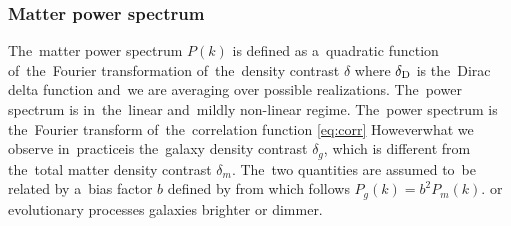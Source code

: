 \subsubsection{Matter power spectrum}
The~matter power spectrum $P(k)$ is defined as a~quadratic function of~the~Fourier transformation of~the~density contrast $\delta$ \DIFaddbegin \parencite{2010deto.book.....A}
\DIFaddend {}
where $\delta_{\rm D}$ is the~Dirac delta function and~we are averaging over possible realizations. The~power spectrum is \DIFdelbegin {}\DIFdelend \DIFaddbegin {}\DIFaddend in~the~linear and~mildly non-linear regime\DIFdelbegin {}\DIFdelend . The~power spectrum is the~Fourier transform of~the~correlation function \eqref{eq:corr}
However\DIFaddbegin \DIFadd{, }\DIFaddend what we observe in~practice\DIFaddbegin \DIFadd{, }\DIFaddend is the~galaxy density contrast $\delta_g$, which is different from the~total matter density contrast $\delta_m$. The~two quantities are assumed to~be related by a~bias factor $b$ defined by \DIFaddbegin \parencite{2010deto.book.....A}
\DIFaddend {}
from which follows $P_g(k)=b^2P_m(k)$. \DIFdelbegin {}\DIFdelend \DIFaddbegin {}\DIFaddend or evolutionary processes \DIFdelbegin {}\DIFdelend \DIFaddbegin {}\DIFaddend galaxies brighter or dimmer\DIFdelbegin {}\DIFdelend .

